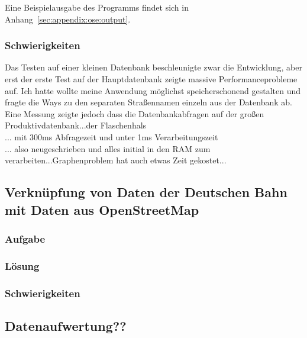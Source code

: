 Eine Beispielausgabe des Programms findet sich in Anhang~\ref{sec:appendix:ose:output}.
   
\subsubsection{Schwierigkeiten}
Das Testen auf einer kleinen Datenbank beschleunigte zwar die Entwicklung, aber erst der erste Test auf der Hauptdatenbank zeigte massive Performanceprobleme auf.
Ich hatte wollte meine Anwendung möglichst speicherschonend gestalten und fragte die Ways zu den separaten Straßennamen  einzeln aus der Datenbank ab.
Eine Messung zeigte jedoch dass die Datenbankabfragen auf der großen Produktivdatenbank...der Flaschenhals \\... mit 300ms Abfragezeit und unter 1ms Verarbeitungszeit\\... also neugeschrieben und alles initial in den RAM zum verarbeiten...Graphenproblem hat auch etwas Zeit gekostet...

\subsection{Verknüpfung von Daten der Deutschen Bahn mit Daten aus OpenStreetMap}
\subsubsection{Aufgabe}
\subsubsection{Lösung}
\subsubsection{Schwierigkeiten}
\subsection{Datenaufwertung??}
